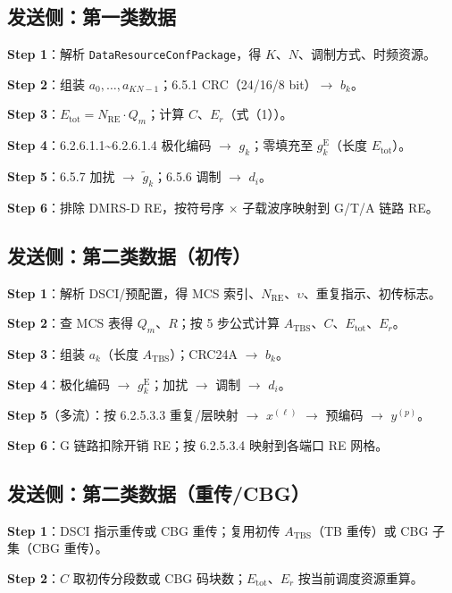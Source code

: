 \documentclass[11pt,a4paper]{ctexart}
\begin{document}
\subsection{发送侧：第一类数据}

\textbf{Step 1}：解析 \texttt{DataResourceConfPackage}，得 $K$、$N$、调制方式、时频资源。

\textbf{Step 2}：组装 $a_0,\ldots,a_{KN-1}$；6.5.1 CRC（24/16/8 bit）$\rightarrow$ $b_k$。

\textbf{Step 3}：$E_{\mathrm{tot}} = N_{\mathrm{RE}} \cdot Q_m$；计算 $C$、$E_r$（式（1））。

\textbf{Step 4}：6.2.6.1.1\textasciitilde 6.2.6.1.4 极化编码 $\rightarrow$ $g_k$；零填充至 $g^{\mathrm{E}}_k$（长度 $E_{\mathrm{tot}}$）。

\textbf{Step 5}：6.5.7 加扰 $\rightarrow$ $\tilde{g}_k$；6.5.6 调制 $\rightarrow$ $d_i$。

\textbf{Step 6}：排除 DMRS-D RE，按符号序 $\times$ 子载波序映射到 G/T/A 链路 RE。

\subsection{发送侧：第二类数据（初传）}

\textbf{Step 1}：解析 DSCI/预配置，得 MCS 索引、$N_{\mathrm{RE}}$、$\upsilon$、重复指示、初传标志。

\textbf{Step 2}：查 MCS 表得 $Q_m$、$R$；按 5 步公式计算 $A_{\mathrm{TBS}}$、$C$、$E_{\mathrm{tot}}$、$E_r$。

\textbf{Step 3}：组装 $a_k$（长度 $A_{\mathrm{TBS}}$）；CRC24A $\rightarrow$ $b_k$。

\textbf{Step 4}：极化编码 $\rightarrow$ $g^{\mathrm{E}}_k$；加扰 $\rightarrow$ 调制 $\rightarrow$ $d_i$。

\textbf{Step 5}（多流）：按 6.2.5.3.3 重复/层映射 $\rightarrow$ $x^{(\ell)}$ $\rightarrow$ 预编码 $\rightarrow$ $y^{(p)}$。

\textbf{Step 6}：G 链路扣除开销 RE；按 6.2.5.3.4 映射到各端口 RE 网格。

\subsection{发送侧：第二类数据（重传/CBG）}

\textbf{Step 1}：DSCI 指示重传或 CBG 重传；复用初传 $A_{\mathrm{TBS}}$（TB 重传）或 CBG 子集（CBG 重传）。

\textbf{Step 2}：$C$ 取初传分段数或 CBG 码块数；$E_{\mathrm{tot}}$、$E_r$ 按当前调度资源重算。
\end{document}
